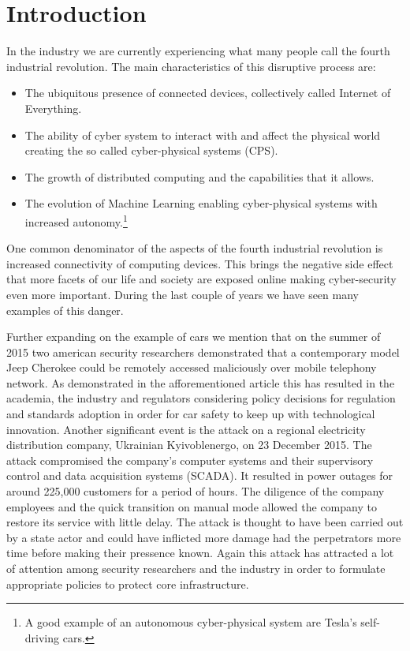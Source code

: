 \documentclass[reqno,openany,12pt]{amsbook}
\begin{document}
\tableofcontents
\listoffigures
\listoftables


\mainmatter

\chapter{Introduction}

In the industry we are currently experiencing what many people call the fourth industrial revolution. The main characteristics of this disruptive process are:
\begin{itemize}
\item The ubiquitous presence of connected devices, collectively called Internet of Everything.
\item The ability of cyber system to interact with and affect the physical world creating the so called cyber-physical systems (CPS).
\item The growth of distributed computing and the capabilities that it allows.
\item The evolution of Machine Learning enabling cyber-physical systems with increased autonomy.\footnote{A good example of an autonomous cyber-physical system are Tesla's self-driving cars.}
\end{itemize}
One common denominator of the aspects of the fourth industrial revolution is increased connectivity of computing devices. This brings the negative side effect that more facets of our life and society are exposed online making cyber-security even more important. During the last couple of years we have seen many examples of this danger.

Further expanding on the example of cars we mention that on the summer of 2015 two american security researchers demonstrated that a contemporary model Jeep Cherokee could be remotely accessed maliciously over mobile telephony network.\cite{intro-car1} As demonstrated in the afforementioned article\cite{intro-car1} this has resulted in the academia, the industry and regulators considering policy decisions for regulation and standards adoption in order for car safety to keep up with technological innovation. Another significant event is the attack on a regional electricity distribution company, Ukrainian Kyivoblenergo, on 23 December 2015. The attack compromised the company's computer systems and their supervisory control and data acquisition systems (SCADA). It resulted in power outages for around 225,000 customers for a period of hours. The diligence of the company employees and the quick transition on 
manual mode allowed the company to restore its service with little delay. The attack is thought to have been carried out by a state actor and could have inflicted more damage had the perpetrators more time before making their pressence known. Again this attack has attracted a lot of attention among security researchers and the industry in order to formulate appropriate policies to protect core infrastructure\cite{intro-cps1}.
\end{document}
